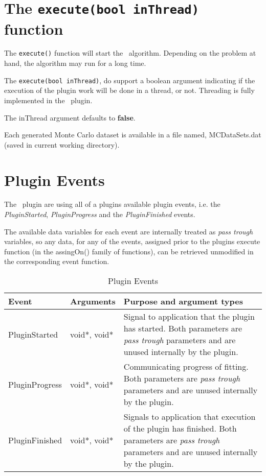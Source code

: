 \section{The \texttt{execute(bool inThread)} function}
The \verb|execute()| function will start the \pname\ algorithm. Depending on the problem at hand, the algorithm may run for a long time. 

The \verb|execute(bool inThread)|, do support a boolean argument indicating if the execution of the plugin work will be done in a thread, or not. Threading is fully implemented in the \pname\ plugin.

The inThread argument defaults to \textbf{false}. 

Each generated Monte Carlo dataset is available in a file named, MCDataSets.dat (saved in current working directory).


\section{Plugin Events}
The \pname\ plugin are using all of a plugins available plugin events, i.e. the \emph{PluginStarted}, \emph{PluginProgress} and the \emph{PluginFinished} events.

The available data variables for each event are internally treated as \emph{pass trough} variables, so any data, for any of the events, assigned prior to 
the plugins execute function (in the assingOn() family of functions), can be retrieved unmodified in the corresponding event function.

\begin{table}[ht]
\centering %
\begin{tabular}{l l p{9cm}} 

Event & Arguments & Purpose and argument types \\ [0.5ex] %
\hline %
PluginStarted  	& 	void*, void*  & Signal to application that the plugin has started. Both parameters are \emph{pass trough} parameters and are unused internally by the plugin.\\[0.5ex]
PluginProgress	& 	void*, void*  & Communicating progress of fitting. Both parameters are \emph{pass trough} parameters and are unused internally by the plugin. \\[0.5ex]
PluginFinished	& 	void*, void*  & Signals to application that execution of the plugin has finished. Both parameters are \emph{pass trough} parameters and are unused internally by the plugin.\\

\hline %
\end{tabular}
\caption{Plugin Events} 
\label{table:MCPluginEvents} 
\end{table}


